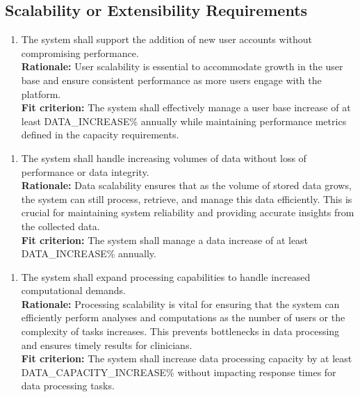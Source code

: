 \documentclass[12pt]{article}
\begin{document}
\subsection{Scalability or Extensibility Requirements}
\begin{enumerate}[label={PR-SE}1. ]
  \item The system shall support the addition of new user accounts without compromising performance.\\
  \textbf{Rationale: }User scalability is essential to accommodate growth in the user base and ensure consistent performance as more users engage with the platform.\\
  \textbf{Fit criterion: }The system shall effectively manage a user base increase of at least DATA\_INCREASE\% annually while maintaining performance metrics defined in the capacity requirements.  
\end{enumerate}
\begin{enumerate}[label={PR-SE}2. ]
  \item The system shall handle increasing volumes of data without loss of performance or data integrity.\\
  \textbf{Rationale: }Data scalability ensures that as the volume of stored data grows, the system can still process, retrieve, and manage this data efficiently. This is crucial for maintaining system reliability and providing accurate insights from the collected data.\\
  \textbf{Fit criterion: }The system shall manage a data increase of at least DATA\_INCREASE\% annually.  
\end{enumerate}
\begin{enumerate}[label={PR-SE}3. ]
  \item The system shall expand processing capabilities to handle increased computational demands.\\
  \textbf{Rationale: }Processing scalability is vital for ensuring that the system can efficiently perform analyses and computations as the number of users or the complexity of tasks increases. This prevents bottlenecks in data processing and ensures timely results for clinicians.\\
  \textbf{Fit criterion: }The system shall increase data processing capacity by at least DATA\_CAPACITY\_INCREASE\% without impacting response times for data processing tasks.  
\end{enumerate}
\end{document}
